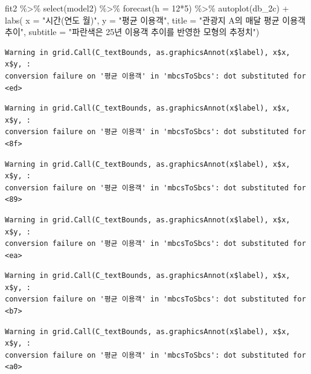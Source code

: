 \documentclass[
  letterpaper,
  DIV=11,
  numbers=noendperiod]{scrreprt}
\newenvironment{Shaded}{\begin{snugshade}}{\end{snugshade}}
\newcommand{\AttributeTok}[1]{\textcolor[rgb]{0.40,0.45,0.13}{#1}}
\newcommand{\DecValTok}[1]{\textcolor[rgb]{0.68,0.00,0.00}{#1}}
\newcommand{\FunctionTok}[1]{\textcolor[rgb]{0.28,0.35,0.67}{#1}}
\newcommand{\NormalTok}[1]{\textcolor[rgb]{0.00,0.23,0.31}{#1}}
\newcommand{\SpecialCharTok}[1]{\textcolor[rgb]{0.37,0.37,0.37}{#1}}
\newcommand{\StringTok}[1]{\textcolor[rgb]{0.13,0.47,0.30}{#1}}
\begin{document}
\begin{Shaded}
\begin{Highlighting}[]
\NormalTok{fit2 }\SpecialCharTok{\%\textgreater{}\%} 
  \FunctionTok{select}\NormalTok{(model2) }\SpecialCharTok{\%\textgreater{}\%} 
  \FunctionTok{forecast}\NormalTok{(}\AttributeTok{h =} \DecValTok{12}\SpecialCharTok{*}\DecValTok{5}\NormalTok{) }\SpecialCharTok{\%\textgreater{}\%} 
  \FunctionTok{autoplot}\NormalTok{(db\_2c) }\SpecialCharTok{+} 
  \FunctionTok{labs}\NormalTok{(}
    \AttributeTok{x =} \StringTok{"시간(연도 월)"}\NormalTok{, }\AttributeTok{y =} \StringTok{"평균 이용객"}\NormalTok{,}
    \AttributeTok{title =} \StringTok{"관광지 A의 매달 평균 이용객 추이"}\NormalTok{,}
    \AttributeTok{subtitle =} \StringTok{"파란색은 25년 이용객 추이를 반영한 모형의 추정치"}\NormalTok{)}
\end{Highlighting}
\end{Shaded}

\begin{verbatim}
Warning in grid.Call(C_textBounds, as.graphicsAnnot(x$label), x$x, x$y, :
conversion failure on '평균 이용객' in 'mbcsToSbcs': dot substituted for <ed>
\end{verbatim}

\begin{verbatim}
Warning in grid.Call(C_textBounds, as.graphicsAnnot(x$label), x$x, x$y, :
conversion failure on '평균 이용객' in 'mbcsToSbcs': dot substituted for <8f>
\end{verbatim}

\begin{verbatim}
Warning in grid.Call(C_textBounds, as.graphicsAnnot(x$label), x$x, x$y, :
conversion failure on '평균 이용객' in 'mbcsToSbcs': dot substituted for <89>
\end{verbatim}

\begin{verbatim}
Warning in grid.Call(C_textBounds, as.graphicsAnnot(x$label), x$x, x$y, :
conversion failure on '평균 이용객' in 'mbcsToSbcs': dot substituted for <ea>
\end{verbatim}

\begin{verbatim}
Warning in grid.Call(C_textBounds, as.graphicsAnnot(x$label), x$x, x$y, :
conversion failure on '평균 이용객' in 'mbcsToSbcs': dot substituted for <b7>
\end{verbatim}

\begin{verbatim}
Warning in grid.Call(C_textBounds, as.graphicsAnnot(x$label), x$x, x$y, :
conversion failure on '평균 이용객' in 'mbcsToSbcs': dot substituted for <a0>
\end{verbatim}
\end{document}
